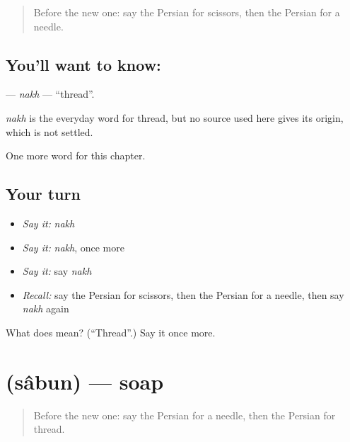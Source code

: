 \label{lesson:FA-C94-nakh}



\begin{quote}
Before the new one: say the Persian for scissors, then the Persian for a needle.
\end{quote}

\subsection*{You'll want to know: }
\textbf{} — \emph{nakh} — \textquotedblleft{}thread\textquotedblright{}.

\begin{cousinweb}
\emph{nakh} is the everyday word for thread, but no source used here gives its origin, which is not settled.
\end{cousinweb}

\begin{grammarlens}[title={What you've built}]
One more word for this chapter.
\end{grammarlens}

\subsection*{Your turn}
\begin{itemize}
\raggedright
  \item \emph{Say it:} \emph{nakh}
  \item \emph{Say it:} \emph{nakh}, once more
  \item \emph{Say it:} say \emph{nakh}
  \item \emph{Recall:} say the Persian for scissors, then the Persian for a needle, then say \emph{nakh} again
\end{itemize}

\begin{tcolorbox}[breakable,colback=teal!4,colframe=teal!35!black,title={Before you move on}]
What does  mean? (\textquotedblleft{}Thread\textquotedblright{}.) Say it once more.
\end{tcolorbox}
\section[\texorpdfstring{\fa{صابون} (sâbun)}{صابون (sâbun)}]{ (sâbun) — soap}

\label{lesson:FA-C94-sabun}



\begin{quote}
Before the new one: say the Persian for a needle, then the Persian for thread.
\end{quote}

